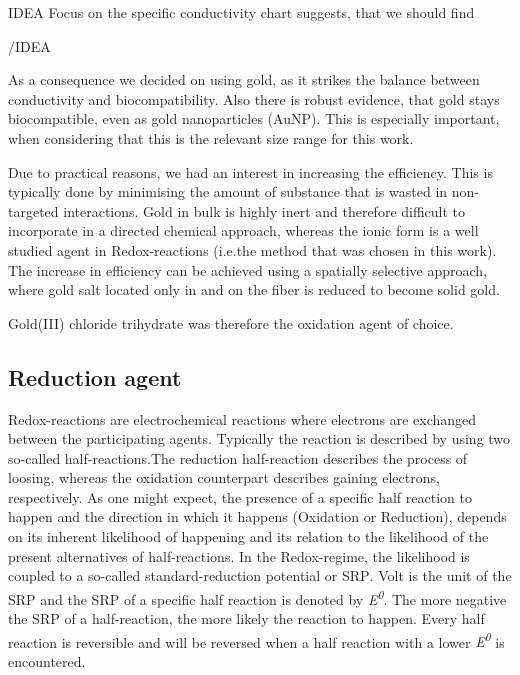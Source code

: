 IDEA
Focus on the specific conductivity chart suggests, that we should find 

/IDEA

As a consequence we decided on using gold, as it strikes the balance between conductivity and 
biocompatibility.  Also there is robust evidence, that gold stays biocompatible, even as gold nanoparticles (AuNP).  This is especially important, when considering that this is the 
relevant size range for this work. \cite{Liu, Shukla}

Due to practical reasons, we had an interest in increasing the efficiency.  This is typically done by minimising the amount of substance that is wasted in non-targeted interactions. Gold in bulk is highly inert and therefore difficult to incorporate in a directed chemical approach, whereas the ionic form is a well studied agent in Redox-reactions (i.e.the method that was chosen in this work). The increase in efficiency can be achieved using a spatially selective approach, where gold salt located only in and on the fiber is reduced to become solid gold.

Gold(III) chloride trihydrate was therefore the oxidation agent of choice. 

\cite{Plasmon, Daniel}

\subsection{Reduction agent}
\label{subsec:RedAgent}

Redox-reactions are electrochemical reactions where electrons are exchanged between 
the participating agents. Typically the reaction is described by using two so-called 
half-reactions.The reduction half-reaction describes the process of loosing, whereas the 
oxidation counterpart describes gaining electrons, respectively. As one might expect, the 
presence of a specific half reaction to happen and the direction in which it happens (Oxidation or Reduction), depends on its inherent likelihood of happening and its relation to the likelihood of the present alternatives of half-reactions.  In the Redox-regime, the likelihood is coupled to a so-called standard-reduction potential or \textsc{SRP}. Volt is the unit of the SRP and the SRP of a specific half reaction is denoted by \textit{E\textsuperscript{0}}.
The more negative the SRP of a half-reaction, the more likely the reaction 
to happen. Every half reaction is reversible and will be reversed when a half reaction with a lower \textit{E\textsuperscript{0}} is encountered. \\[0.2cm]

